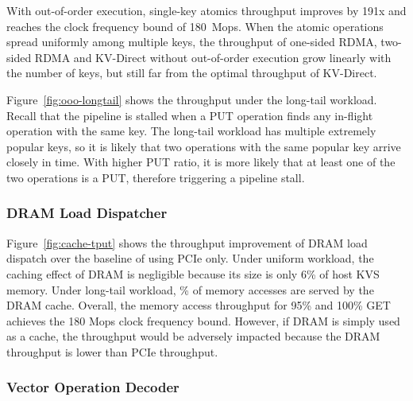 With out-of-order execution, single-key atomics throughput improves by 191x and reaches the clock frequency bound of 180~Mops.
When the atomic operations spread uniformly among multiple keys, the throughput of one-sided RDMA, two-sided RDMA and KV-Direct without out-of-order execution grow linearly with the number of keys, but still far from the optimal throughput of KV-Direct.

Figure~\ref{fig:ooo-longtail} shows the throughput under the long-tail workload.
Recall that the pipeline is stalled when a PUT operation finds any in-flight operation with the same key.
The long-tail workload has multiple extremely popular keys, so it is likely that two operations with the same popular key arrive closely in time.
With higher PUT ratio, it is more likely that at least one of the two operations is a PUT, therefore triggering a pipeline stall.


\subsubsection{DRAM Load Dispatcher}
\label{sec:dram-eval}

Figure~\ref{fig:cache-tput} shows the throughput improvement of DRAM load dispatch over the baseline of using PCIe only.
Under uniform workload, the caching effect of DRAM is negligible because its size is only 6\% of host KVS memory.
Under long-tail workload, \% of memory accesses are served by the DRAM cache. Overall, the memory access throughput for 95\% and 100\% GET achieves the 180 Mops clock frequency bound.
However, if DRAM is simply used as a cache, the throughput would be adversely impacted because the DRAM throughput is lower than PCIe throughput.

\subsubsection{Vector Operation Decoder}
\label{network-eval}

\begin{table}[]
\centering
{}
\caption{Throughput (GB/s) of vector operations with vector update or alternatives.}
\label{tab:vec_throughput}
\vspace{-15pt}
\end{table}

